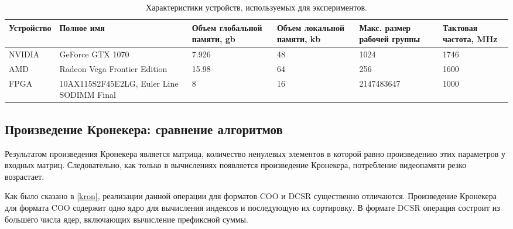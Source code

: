 \documentclass[14pt]{extarticle}
\begin{document}
	\begin{table} 
		\centering
		\scriptsize
		\small
		\begin{tabular}{ |p{2.1cm} |p{3cm}|p{2cm}|p{2cm}|p{2cm}|p{1.7cm}|} 
			\hline 
			Устройство & Полное имя  & Объем глобальной памяти, gb  & Объем локальной памяти, kb & Макс. размер рабочей группы & Тактовая частота, MHz\\ \hline 
			NVIDIA & GeForce GTX 1070 & 7.926 & 48 & 1024 & 1746 \\ \hline
			AMD &  Radeon Vega Frontier Edition & 15.98 & 64 & 256 & 1600  \\ \hline
			FPGA &  10AX115S2F45E2LG, Euler Line SODIMM Final & 
			8 & 16 & 2147483647 & 1000 \\ \hline
	

		\end{tabular}
		\caption{Характеристики устройств, используемых для экспериментов.}
		\label{table:devs}
	\end{table} 
	 
	
	\subsection{Произведение Кронекера: сравнение алгоритмов}
	
	Результатом произведения Кронекера является матрица, количество ненулевых элементов в которой равно произведению этих параметров у входных матриц. Следовательно, как только в вычислениях появляется произведение Кронекера, потребление видеопамяти резко возрастает.
	
	Как было сказано в \ref{kron}, реализации данной операции для форматов COO и DCSR существенно отличаются. Произведение Кронекера для формата COO содержит одно ядро для вычисления индексов и последующую их сортировку. В формате DCSR операция состроит из б\emph{о}льшего числа ядер, включающих вычисление префиксной суммы. 
	
\end{document}
